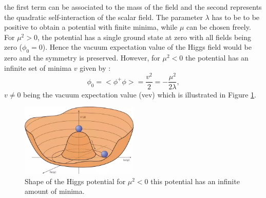 the first term can be associated to the mass of the field and the second represents the quadratic self-interaction of the scalar field. The parameter $\lambda$ has to be to be positive to obtain a potential with finite minima, while $\mu$ can be chosen freely. For $\mu^{2} > 0$, the potential has a single ground state at zero with all fields being zero ($\phi_0 = 0$). Hence the vacuum expectation value of the Higgs field would be zero and the symmetry is preserved. However, for $\mu^{2} < 0$ the potential has an infinite set of minima $v$ given by :
\begin{equation}
    \phi_{0}=<\phi^{+} \phi>=\frac{v^{2}}{2}=-\frac{\mu^{2}}{2 \lambda},
\end{equation}
$v\neq0$ being the vacuum expectation value (vev) which is illustrated in Figure \ref{fig:chap1:Higggs_potential}.
\begin{figure}[H]
    \centering
    \includegraphics[width=0.5\textwidth]{Ch1/Img/Higgs_potential.png}
    \caption{Shape of the Higgs potential for $\mu^{2} < 0$ this potential has an infinite amount of minima. \cite{HiggsPotential}}
    \label{fig:chap1:Higggs_potential}
\end{figure}


